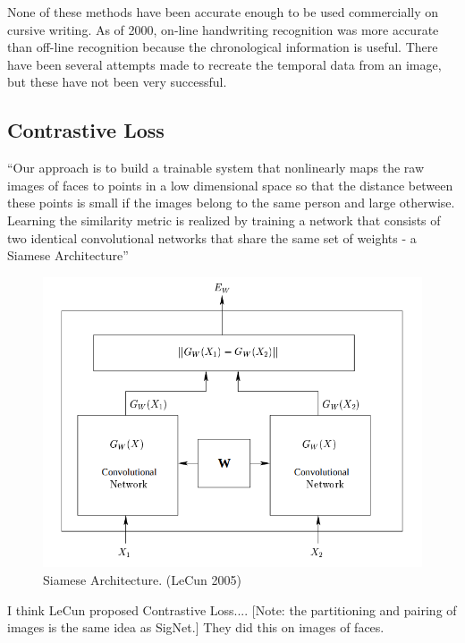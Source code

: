 None of these methods have been accurate enough to be used commercially on cursive writing\cite{handwriting_survey}.
As of 2000, on-line handwriting recognition was more accurate than off-line recognition because the chronological information is useful\cite{handwriting_survey}.
There have been several attempts made to recreate the temporal data from an image, but these have not been very successful\cite{handwriting_survey}.


\subsection{Contrastive Loss}
``Our approach is to build a trainable system that nonlinearly maps the raw images of faces to points in a low dimensional space so that the distance between these points is
small if the images belong to the same person and large otherwise. Learning the similarity metric is realized by training a network that consists of two identical convolutional
networks that share the same set of weights - a Siamese Architecture''
\begin{figure}[h]
    \begin{center}
        \includegraphics[width=0.8\linewidth]{siamese_architecture.png}
    \end{center}
    \caption{Siamese Architecture. (LeCun 2005)}
    \label{fig:siamese}
\end{figure}
I think LeCun proposed Contrastive Loss...\cite{LeCun}.
[Note: the partitioning and pairing of images is the same idea as SigNet.]
They did this on images of faces.

